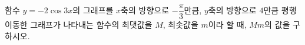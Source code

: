 함수 $y=-2\cos 3x$의 그래프를 $x$축의 방향으로 $-\dfrac{\pi}{3}$만큼, $y$축의 방향으로 $4$만큼 평행이동한 그래프가 나타내는 함수의 최댓값을 $M$, 최솟값을 $m$이라 할 때, $Mm$의 값을 구하시오.
